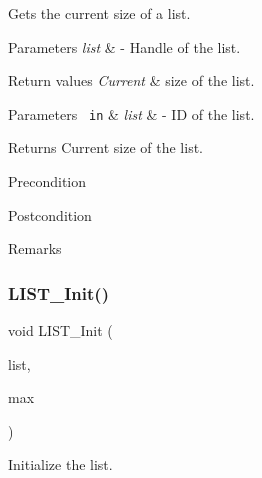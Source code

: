 Gets the current size of a list. 


\begin{DoxyParams}{Parameters}
{\em list} & -\/ Handle of the list.\\
\hline
\end{DoxyParams}

\begin{DoxyRetVals}{Return values}
{\em Current} & size of the list.\\
\hline
\end{DoxyRetVals}


 
\begin{DoxyParams}[1]{Parameters}
\mbox{\texttt{ in}}  & {\em list} & -\/ ID of the list.\\
\hline
\end{DoxyParams}
\begin{DoxyReturn}{Returns}
Current size of the list.
\end{DoxyReturn}
\begin{DoxyPrecond}{Precondition}

\end{DoxyPrecond}
\begin{DoxyPostcond}{Postcondition}

\end{DoxyPostcond}
\begin{DoxyRemark}{Remarks}
\begin{DoxyVerb}\end{DoxyVerb}
 
\end{DoxyRemark}
\mbox{\label{group___generic_list_gab8252f6f60664cadc5a977fb3c0c4bdc}} 
\subsubsection{\texorpdfstring{LIST\_Init()}{LIST\_Init()}}
{\footnotesize\ttfamily void L\+I\+S\+T\+\_\+\+Init (\begin{DoxyParamCaption}\item[{\mbox{\hyperlink{structlist__label}{list\+\_\+handle\+\_\+t}}}]{list,  }\item[{uint32\+\_\+t}]{max }\end{DoxyParamCaption})}



Initialize the list. 





